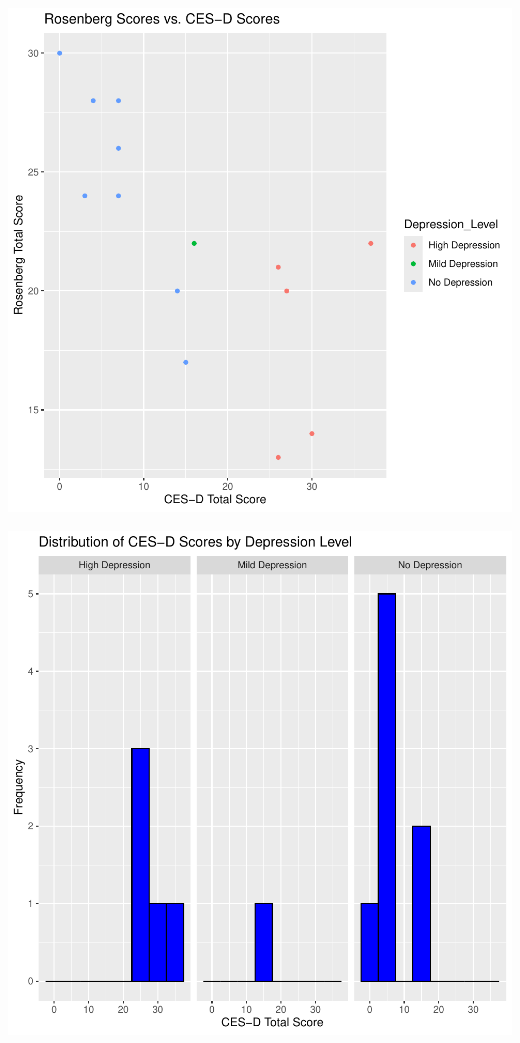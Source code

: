 \documentclass[
  man,
  longtable,
  nolmodern,
  notxfonts,
  notimes,
  colorlinks=true,linkcolor=blue,citecolor=blue,urlcolor=blue]{apa7}
\begin{document}
\includegraphics{SE-SCC-Depression_files/figure-pdf/RSES-versus-CESD-total-1.pdf}

\includegraphics{SE-SCC-Depression_files/figure-pdf/CESD-total-versus-level-1.pdf}
\end{document}
